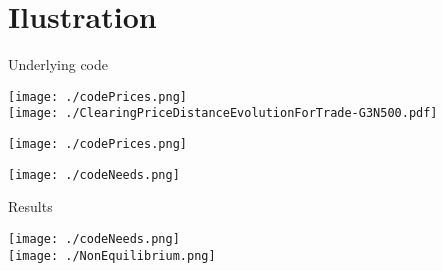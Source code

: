 \documentclass[8pt, handout=show,notes=show]{beamer}
\begin{document}
\section{Ilustration}

\begin{frame}{Underlying code}
	\begin{center}
		\texttt{[image: ./codePrices.png]}\\
		\texttt{[image: ./ClearingPriceDistanceEvolutionForTrade-G3N500.pdf]}
	\end{center}
\end{frame}
\begin{frame}{}
	\begin{center}
		\texttt{[image: ./codePrices.png]}\\
	\end{center}
\end{frame}

\begin{frame}
	\begin{center}

		\texttt{[image: ./codeNeeds.png]}\\
	\end{center}
\end{frame}

\begin{frame}{Results}
	\begin{center}

		\texttt{[image: ./codeNeeds.png]}\\
		\texttt{[image: ./NonEquilibrium.png]}
	\end{center}
\end{frame}
\end{document}
